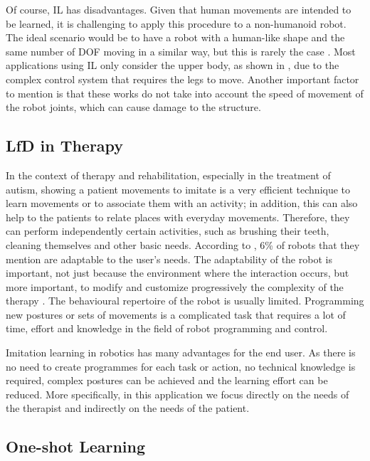 \documentclass[thesis]{mas_proposal}
\begin{document}
		Of course, IL has disadvantages. Given that human movements are intended to be learned, it is challenging to apply this procedure to a non-humanoid robot. The ideal scenario would be to have a robot with a human-like shape and the same number of DOF moving in a similar way, but this is rarely the case \cite{Ravichandar2020}. Most applications using IL only consider the upper body, as shown in \cite{VanPerre2015}, due to the complex control system that requires the legs to move. Another important factor to mention is that these works do not take into account the speed of movement of the robot joints, which can cause damage to the structure. 
		
	\subsection{LfD in Therapy}
	
		In the context of therapy and rehabilitation, especially in the treatment of autism, showing a patient movements to imitate is a very efficient technique to learn movements or to associate them with an activity; in addition, this can also help to the patients to relate places with everyday movements. Therefore, they can perform independently certain activities, such as brushing their teeth, cleaning themselves and other basic needs. According to \cite{Cabibihan2013}, 6\% of robots that they mention are adaptable to the user's needs. The adaptability of the robot is important, not just because the environment where the interaction occurs, but more important, to modify and customize progressively the complexity of the therapy \cite{Dickstein2018}. The behavioural repertoire of the robot is usually limited. Programming new postures or sets of movements is a complicated task that requires a lot of time, effort and knowledge in the field of robot programming and control.
		
		Imitation learning in robotics has many advantages for the end user. As there is no need to create programmes for each task or action, no technical knowledge is required, complex postures can be achieved and the learning effort can be reduced. More specifically, in this application we focus directly on the needs of the therapist \cite{Ravichandar2020, Kulikovskiy2021} and indirectly on the needs of the patient. 	

	\subsection{One-shot Learning}
\end{document}
